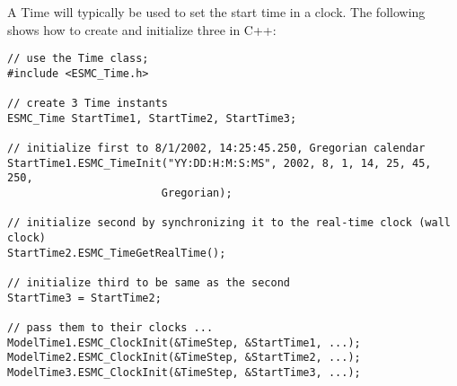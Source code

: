 
A Time will typically be used to set the start time in a
clock.  The following shows how to create and initialize three in C++:

\begin{verbatim}
// use the Time class;
#include <ESMC_Time.h>

// create 3 Time instants
ESMC_Time StartTime1, StartTime2, StartTime3;

// initialize first to 8/1/2002, 14:25:45.250, Gregorian calendar
StartTime1.ESMC_TimeInit("YY:DD:H:M:S:MS", 2002, 8, 1, 14, 25, 45, 250,
                        Gregorian);

// initialize second by synchronizing it to the real-time clock (wall clock)
StartTime2.ESMC_TimeGetRealTime();

// initialize third to be same as the second
StartTime3 = StartTime2;

// pass them to their clocks ...
ModelTime1.ESMC_ClockInit(&TimeStep, &StartTime1, ...);
ModelTime2.ESMC_ClockInit(&TimeStep, &StartTime2, ...);
ModelTime3.ESMC_ClockInit(&TimeStep, &StartTime3, ...);
\end{verbatim}
